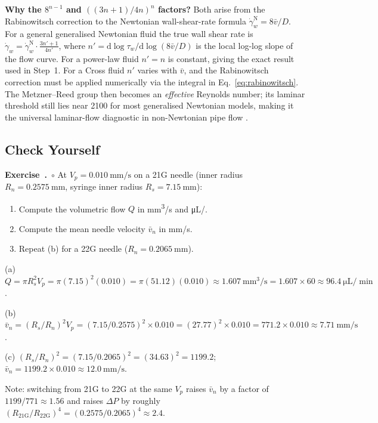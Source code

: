 \documentclass[11pt,a4paper]{article}
\newcommand{\diffA}{\textcolor{green!55!black}{$\circ$}}
\newcounter{exidx}[section]
\renewcommand{\theexidx}{\thesection.\arabic{exidx}}
\newenvironment{exercise}[1]%
  {\par\smallskip\refstepcounter{exidx}%
   \noindent\textbf{Exercise~\theexidx}~#1\quad}
  {\par\smallskip}
\newcommand{\gd}{\dot{\gamma}}
\begin{document}
\begin{goingdeeperbox}
\textbf{Why the $8^{n-1}$ and $((3n+1)/4n)^n$ factors?}
Both arise from the Rabinowitsch correction to the Newtonian wall-shear-rate
formula $\gd_w^\mathrm{N}=8\bar v/D$. For a general generalised Newtonian
fluid the true wall shear rate is
$\gd_w = \gd_w^\mathrm{N}\cdot\tfrac{3n'+1}{4n'}$, where $n'=
\mathrm{d}\log\tau_w/\mathrm{d}\log(8\bar v/D)$ is the local log-log slope
of the flow curve. For a power-law fluid $n'=n$ is constant, giving the
exact result used in Step~1. For a Cross fluid $n'$ varies with $\bar v$,
and the Rabinowitsch correction must be applied numerically via the integral
in Eq.~\ref{eq:rabinowitsch}. The Metzner--Reed group then becomes an
\emph{effective} Reynolds number; its laminar threshold still lies near 2100
for most generalised Newtonian models, making it the universal laminar-flow
diagnostic in non-Newtonian pipe flow \citep{MetznerReed1955}.
\end{goingdeeperbox}

\subsection*{Check Yourself}
\label{sec:hydraulic_exercises}

\begin{exercise}{\diffA}
At $V_p=\SI{0.010}{\mm/\s}$ on a 21G needle (inner radius
$R_n=\SI{0.2575}{\mm}$, syringe inner radius $R_s=\SI{7.15}{\mm}$):
\begin{enumerate}[label=(\alph*),leftmargin=1.6em,itemsep=1pt]
  \item Compute the volumetric flow $Q$ in \si{\mm^3/\s} and
    \si{\micro\liter/\min}.
  \item Compute the mean needle velocity $\bar v_n$ in \si{\mm/\s}.
  \item Repeat (b) for a 22G needle ($R_n=\SI{0.2065}{\mm}$).
\end{enumerate}
\begin{solution}
(a) $Q = \pi R_s^2 V_p = \pi(7.15)^2(0.010)
       = \pi(51.12)(0.010) \approx \SI{1.607}{\mm^3/\s}
       = 1.607\times60 \approx \SI{96.4}{\micro\liter/\min}$.

(b) $\bar v_n = (R_s/R_n)^2 V_p = (7.15/0.2575)^2 \times 0.010
              = (27.77)^2 \times 0.010 = 771.2 \times 0.010
              \approx \SI{7.71}{\mm/\s}$.

(c) $(R_s/R_n)^2 = (7.15/0.2065)^2 = (34.63)^2 = 1199.2$;
    $\bar v_n = 1199.2 \times 0.010 \approx \SI{12.0}{\mm/\s}$.

Note: switching from 21G to 22G at the same $V_p$ raises $\bar v_n$
by a factor of $1199/771\approx 1.56$ and raises $\Delta P$ by roughly
$(R_\mathrm{21G}/R_\mathrm{22G})^4 = (0.2575/0.2065)^4 \approx 2.4$.
\end{solution}
\end{exercise}
\end{document}
